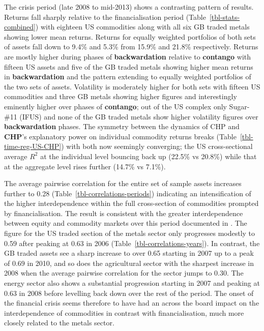\documentclass[
  authoryear,
  preprint,
  3p]{elsarticle}
\begin{document}
\bigskip
\bigskip

The crisis period (late 2008 to mid-2013) shows a contrasting pattern of
results. Returns fall sharply relative to the financialisation period
(Table~\ref{tbl-stats-combined}) with eighteen US commodities along with
all six GB traded metals showing lower mean returns. Returns for equally
weighted portfolios of both sets of assets fall down to 9.4\% and 5.3\%
from 15.9\% and 21.8\% respectively. Returns are mostly higher during
phases of \textbf{backwardation} relative to \textbf{contango} with
fifteen US assets and five of the GB traded metals showing higher mean
returns in \textbf{backwardation} and the pattern extending to equally
weighted portfolios of the two sets of assets. Volatility is moderately
higher for both sets with fifteen US commodities and three GB metals
showing higher figures and interestingly eminently higher over phases of
\textbf{contango}; out of the US complex only Sugar-\#11 (IFUS) and none
of the GB traded metals show higher volatility figures over
\textbf{backwardation} phases. The symmetry between the dynamics of CHP
and \textbf{CHP}'s explanatory power on individual commodity returns
breaks (Table~\ref{tbl-time-reg-US-CHP}) with both now seemingly
converging; the US cross-sectional average \(R^{2}\) at the individual
level bouncing back up (22.5\% vs 20.8\%) while that at the aggregate
level rises further (14.7\% vs 7.1\%).

\medskip

The average pairwise correlation for the entire set of sample assets
increases further to 0.28 (Table~\ref{tbl-correlations-periods})
indicating an intensification of the higher interdependence within the
full cross-section of commodities prompted by financialisation. The
result is consistent with the greater interdependence between equity and
commodity markets over this period documented in
\citet{silvennoinen_financialisation_2013}. The figure for the US traded
section of the metals sector only progresses modestly to 0.59 after
peaking at 0.63 in 2006 (Table~\ref{tbl-correlations-years}). In
contrast, the GB traded assets see a sharp increase to over 0.65
starting in 2007 up to a peak of 0.69 in 2010, and so does the
agricultural sector with the sharpest increase in 2008 when the average
pairwise correlation for the sector jumps to 0.30. The energy sector
also shows a substantial progression starting in 2007 and peaking at
0.63 in 2008 before levelling back down over the rest of the period. The
onset of the financial crisis seems therefore to have had an across the
board impact on the interdependence of commodities in contrast with
financialisation, much more closely related to the metals sector.
\end{document}
